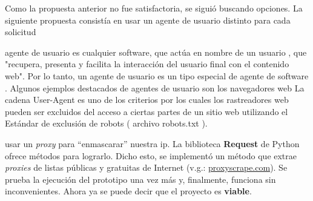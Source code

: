 Como la propuesta anterior no fue satisfactoria, se siguió buscando opciones. La siguiente propuesta consistía en usar un agente de usuario distinto para cada solicitud

agente de usuario es cualquier software, que actúa en nombre de un usuario , que "recupera, presenta y facilita la interacción del usuario final con el contenido web". Por lo tanto, un agente de usuario es un tipo especial de agente de software .
Algunos ejemplos destacados de agentes de usuario son los navegadores web
La cadena User-Agent es uno de los criterios por los cuales los rastreadores web pueden ser excluidos del acceso a ciertas partes de un sitio web utilizando el Estándar de exclusión de robots ( archivo robots.txt ).

usar un \textit{proxy} para ``enmascarar'' nuestra ip. La biblioteca \textbf{Request} de Python ofrece métodos para lograrlo. Dicho esto, se implementó un método que extrae \textit{proxies} de listas públicas y gratuitas de Internet (v.g.: \href{https://www.proxyscrape.com/free-proxy-list}{proxyscrape.com}). Se prueba la ejecución del prototipo una vez más y, finalmente, funciona sin inconvenientes. Ahora ya se puede decir que el proyecto es \textbf{viable}.


